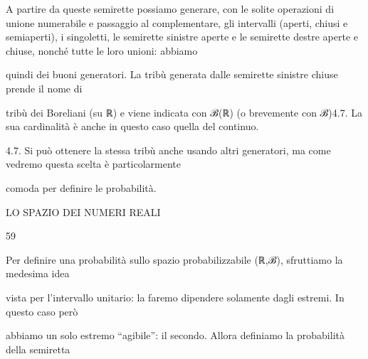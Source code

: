 \documentclass[a4paper,portrait,12pt]{article}
\begin{document}
\begin{flushleft}
A partire da queste semirette possiamo generare, con le solite operazioni di unione numerabile e passaggio al complementare, gli intervalli (aperti, chiusi e semiaperti), i singoletti, le semirette sinistre aperte e le semirette destre aperte e chiuse, nonch\'{e} tutte le loro unioni: abbiamo
\end{flushleft}


\begin{flushleft}
quindi dei buoni generatori. La tribù generata dalle semirette sinistre chiuse prende il nome di
\end{flushleft}


\begin{flushleft}
tribù dei Boreliani (su ℝ) e viene indicata con ℬ(ℝ) (o brevemente con ℬ)4.7. La sua cardinalit\`{a} \`{e} anche in questo caso quella del continuo.
\end{flushleft}


\begin{flushleft}
4.7. Si pu\`{o} ottenere la stessa tribù anche usando altri generatori, ma come vedremo questa scelta \`{e} particolarmente
\end{flushleft}


\begin{flushleft}
comoda per definire le probabilit\`{a}.
\end{flushleft}





\begin{flushleft}
 LO SPAZIO DEI NUMERI REALI
\end{flushleft}





59





\begin{flushleft}
Per definire una probabilit\`{a} sullo spazio probabilizzabile (ℝ,ℬ), sfruttiamo la medesima idea
\end{flushleft}


\begin{flushleft}
vista per l'intervallo unitario: la faremo dipendere solamente dagli estremi. In questo caso per\`{o}
\end{flushleft}


\begin{flushleft}
abbiamo un solo estremo {``}agibile'': il secondo. Allora definiamo la probabilit\`{a} della semiretta
\end{flushleft}
\end{document}
